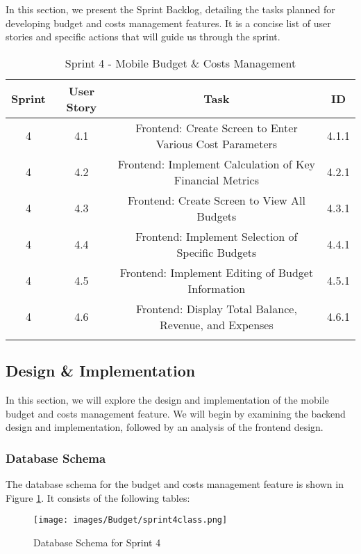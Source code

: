In this section, we present the Sprint Backlog, detailing the tasks planned for developing budget and costs management features. It is a concise list of user stories and specific actions that will guide us through the sprint.

\setlength{\LTleft}{0pt}
\begin{longtable}{|c|c|c|c|}
\hline
\textbf{Sprint} & \textbf{User Story} & \textbf{Task} & \textbf{ID} \\
\hline
4 & 4.1 & Frontend: Create Screen to Enter Various Cost Parameters & 4.1.1 \\
\hline
4 & 4.2 & Frontend: Implement Calculation of Key Financial Metrics & 4.2.1 \\
\hline
4 & 4.3 & Frontend: Create Screen to View All Budgets & 4.3.1 \\
\hline
4 & 4.4 & Frontend: Implement Selection of Specific Budgets & 4.4.1 \\
\hline
4 & 4.5 & Frontend: Implement Editing of Budget Information & 4.5.1 \\
\hline
4 & 4.6 & Frontend: Display Total Balance, Revenue, and Expenses & 4.6.1 \\
\hline
\caption{Sprint 4 - Mobile Budget \& Costs Management}
\label{tab:sprint4_backlog}
\end{longtable}

\subsection{Design \& Implementation}

In this section, we will explore the design and implementation of the mobile budget and costs management feature. We will begin by examining the backend design and implementation, followed by an analysis of the frontend design.

\subsubsection{Database Schema}

The database schema for the budget and costs management feature is shown in Figure \ref{fig:db_schema_sprint4}. It consists of the following tables:

\begin{figure}[H]
    \centering
    \texttt{[image: images/Budget/sprint4class.png]}
    \caption{Database Schema for Sprint 4}
    \label{fig:db_schema_sprint4}
\end{figure}

